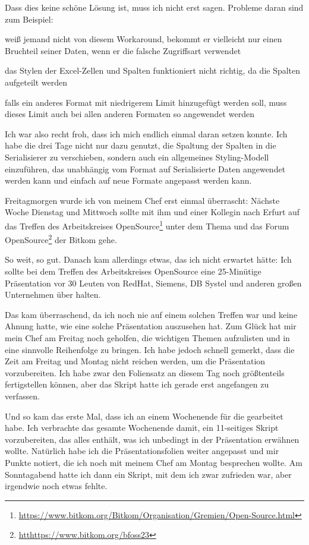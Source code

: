 Dass dies keine schöne Lösung ist, muss ich nicht erst sagen.
Probleme daran sind zum Beispiel:

\begin{smitemize}
    \item weiß jemand nicht von diesem Workaround, bekommt er vielleicht nur einen Bruchteil seiner Daten, wenn er die falsche Zugriffsart verwendet
    \item das Stylen der Excel-Zellen und Spalten funktioniert nicht richtig, da die Spalten aufgeteilt werden
    \item falls ein anderes Format mit niedrigerem Limit hinzugefügt werden soll, muss dieses Limit auch bei allen anderen Formaten so angewendet werden
\end{smitemize}

Ich war also recht froh, dass ich mich endlich einmal daran setzen konnte.
Ich habe die drei Tage nicht nur dazu genutzt, die Spaltung der Spalten in die Serialisierer zu verschieben, sondern auch ein allgemeines Styling-Modell einzuführen, das unabhängig vom Format auf Serialisierte Daten angewendet werden kann und einfach auf neue Formate angepasst werden kann.

Freitagmorgen wurde ich von meinem Chef erst einmal überrascht:
Nächste Woche Dienstag und Mittwoch sollte mit ihm und einer Kollegin nach Erfurt auf das Treffen des Arbeitskreises OpenSource\footnote{\url{https://www.bitkom.org/Bitkom/Organisation/Gremien/Open-Source.html}} unter dem Thema  und das Forum OpenSource\footnote{\url{htthttps://www.bitkom.org/bfoss23}} der Bitkom gehe.

So weit, so gut.
Danach kam allerdings etwas, das ich nicht erwartet hätte: Ich sollte bei dem Treffen des Arbeitskreises OpenSource eine 25-Minütige Präsentation vor 30 Leuten von RedHat, Siemens, DB Systel und anderen großen Unternehmen über  halten.

Das kam überraschend, da ich noch nie auf einem solchen Treffen war und keine Ahnung hatte, wie eine solche Präsentation auszusehen hat.
Zum Glück hat mir mein Chef am Freitag noch geholfen, die wichtigen Themen aufzulisten und in eine sinnvolle Reihenfolge zu bringen.
Ich habe jedoch schnell gemerkt, dass die Zeit am Freitag und Montag nicht reichen werden, um die Präsentation vorzubereiten.
Ich habe zwar den Foliensatz an diesem Tag noch größtenteils fertigstellen können, aber das Skript hatte ich gerade erst angefangen zu verfassen.

Und so kam das erste Mal, dass ich an einem Wochenende für die {\metaeffekt} gearbeitet habe.
Ich verbrachte das gesamte Wochenende damit, ein 11-seitiges Skript vorzubereiten, das alles enthält, was ich unbedingt in der Präsentation erwähnen wollte.
Natürlich habe ich die Präsentationsfolien weiter angepasst und mir Punkte notiert, die ich noch mit meinem Chef am Montag besprechen wollte.
Am Sonntagabend hatte ich dann ein Skript, mit dem ich zwar zufrieden war, aber irgendwie noch etwas fehlte.
